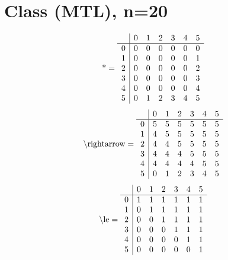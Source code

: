 \documentclass[11pt]{article}
\begin{document}
\section{Class (MTL), n=20}
\[\text{*} = 
\begin{array}{r | r r r r r r}
 & 0 & 1 & 2 & 3 & 4 & 5 \\ \hline
0 & 0 & 0 & 0 & 0 & 0 & 0 \\
1 & 0 & 0 & 0 & 0 & 0 & 1 \\
2 & 0 & 0 & 0 & 0 & 0 & 2 \\
3 & 0 & 0 & 0 & 0 & 0 & 3 \\
4 & 0 & 0 & 0 & 0 & 0 & 4 \\
5 & 0 & 1 & 2 & 3 & 4 & 5 \\
\end{array}
\]
\[\text{\textbackslash rightarrow} = 
\begin{array}{r | r r r r r r}
 & 0 & 1 & 2 & 3 & 4 & 5 \\ \hline
0 & 5 & 5 & 5 & 5 & 5 & 5 \\
1 & 4 & 5 & 5 & 5 & 5 & 5 \\
2 & 4 & 4 & 5 & 5 & 5 & 5 \\
3 & 4 & 4 & 4 & 5 & 5 & 5 \\
4 & 4 & 4 & 4 & 4 & 5 & 5 \\
5 & 0 & 1 & 2 & 3 & 4 & 5 \\
\end{array}
\]
\[\text{\textbackslash le} = 
\begin{array}{r | r r r r r r}
 & 0 & 1 & 2 & 3 & 4 & 5 \\ \hline
0 & 1 & 1 & 1 & 1 & 1 & 1 \\
1 & 0 & 1 & 1 & 1 & 1 & 1 \\
2 & 0 & 0 & 1 & 1 & 1 & 1 \\
3 & 0 & 0 & 0 & 1 & 1 & 1 \\
4 & 0 & 0 & 0 & 0 & 1 & 1 \\
5 & 0 & 0 & 0 & 0 & 0 & 1 \\
\end{array}
\]
\end{document}
